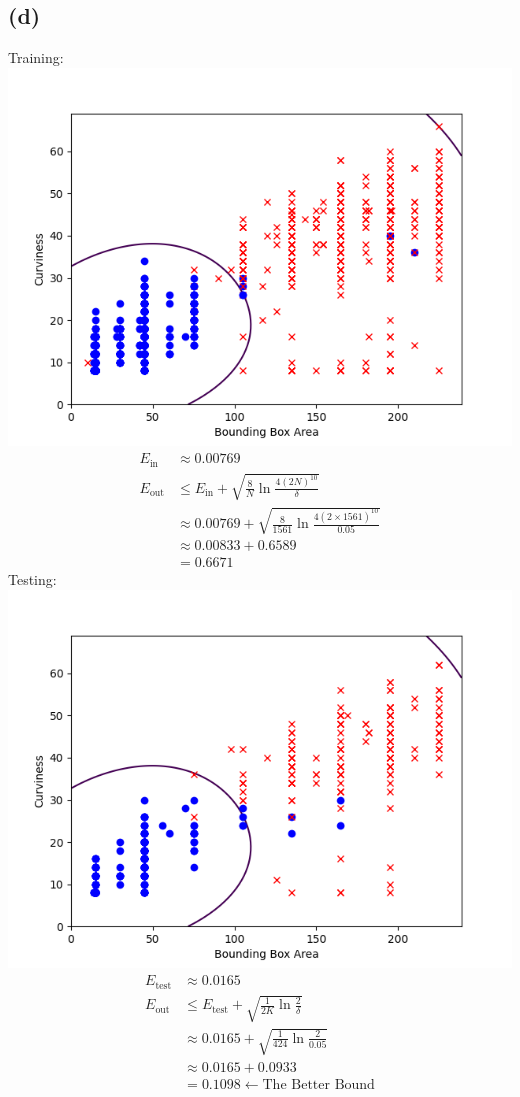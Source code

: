 \documentclass{article}
\begin{document}
		\subsection*{(d)}
			Training:\\
			\includegraphics[scale=0.5]{train_3o.png}
			\begin{align*}
				E_{\text{in}} &\approx 0.00769\\
				E_{\text{out}} &\leq E_{\text{in}} + \sqrt{ \frac8N \ln \frac{4(2N)^{10}}\delta }\\
				&\approx 0.00769 + \sqrt{ \frac8{1561} \ln \frac{4(2\times 1561)^{10}}{0.05} }\\
				&\approx 0.00833 + 0.6589\\
				&= \boxed{0.6671}
			\end{align*}
			Testing: 
			\includegraphics[scale=0.5]{test_3o.png}
			\begin{align*}
				E_{\text{test}} &\approx 0.0165\\
				E_{\text{out}} &\leq E_{\text{test}} + \sqrt{ \frac1{2K} \ln \frac{2}\delta }\\
				&\approx 0.0165 + \sqrt{ \frac1{424} \ln \frac{2}{0.05} }\\
				&\approx 0.0165 + 0.0933\\
				&= \boxed{0.1098} \leftarrow \text{The Better Bound}
			\end{align*}
			
\end{document}
